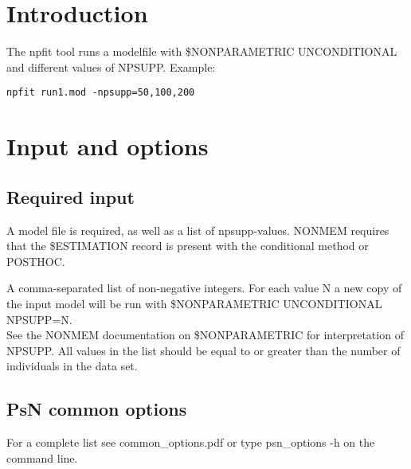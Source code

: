 
\usepackage{hyperref}
\newcommand{\guidetoolname}{npfit}



\maketitle
\tableofcontents
\newpage

\section{Introduction}

The npfit tool runs a modelfile with \$NONPARAMETRIC UNCONDITIONAL and different values of NPSUPP.
Example:
\begin{verbatim}
npfit run1.mod -npsupp=50,100,200
\end{verbatim}

\section{Input and options}

\subsection{Required input}
A model file is required, as well as a list of npsupp-values. NONMEM requires that the \$ESTIMATION record is present with the conditional method or POSTHOC.
\begin{optionlist}
A comma-separated list of non-negative integers. For each value N a new copy of the input model will be run with \$NONPARAMETRIC UNCONDITIONAL NPSUPP=N.\\ See the NONMEM documentation on \$NONPARAMETRIC for interpretation of NPSUPP.
All values in the list should be equal to or greater than the number of individuals in the data set.
\nextopt
\end{optionlist}





\subsection{PsN common options}
For a complete list see common\_options.pdf or type psn\_options -h on the command line.

